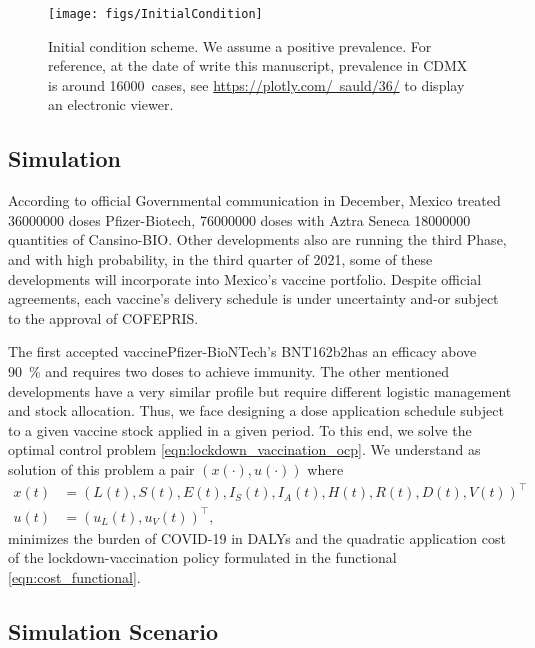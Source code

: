 \begin{figure*}
    \centering
    \texttt{[image: figs/InitialCondition]}
    \caption[Initial condition]{
        Initial condition scheme. We assume a positive prevalence. 
        For reference, at the date of write this manuscript, prevalence in CDMX 
        is around \SI{16000}{cases}, see
        \href{https://plotly.com/~sauld/36/}{https://plotly.com/~sauld/36/}
        to display an electronic viewer.}
        \label{fig:initialcondition}
\end{figure*}
\subsection{Simulation}
 According to official Governmental communication in December, Mexico treated  
\num{36000000} doses  Pfizer-Biotech, \num{76000000} doses with Aztra Seneca 
\num{18000000} quantities of Cansino-BIO. Other developments 
also are running the third Phase, and with high probability,  in the third
quarter of 2021, some of these developments will incorporate into Mexico's 
vaccine portfolio. Despite official agreements, each vaccine's delivery schedule 
is under uncertainty and-or subject to the approval of COFEPRIS.

The first accepted vaccine\textemdash Pfizer-BioNTech's BNT162b2\textemdash has 
an efficacy above \SI{90}{\percent} and requires two doses to achieve immunity. 
The other mentioned developments have a very similar profile but require different
logistic management and stock allocation.
Thus, we face designing a dose application schedule subject to a given vaccine stock 
applied in a given period. To this end, we solve the optimal control problem 
\eqref{eqn:lockdown_vaccination_ocp}. We understand as solution of this problem
a pair $(x(\cdot), u(\cdot))$ where
\begin{equation}
    \begin{aligned}
        x(t) &= (L(t), S(t), E(t), I_S(t), I_A(t), H(t), R(t), D(t), V(t))^{\top}
        \\
        u(t) &= (u_L(t), u_V(t)) ^ {\top},
    \end{aligned}
\end{equation}
minimizes the burden of COVID-19 in DALYs \cite{WhoDALY} and the quadratic application
cost of the lockdown-vaccination policy formulated in the functional \eqref{eqn:cost_functional}.  

\subsection*{Simulation Scenario}
